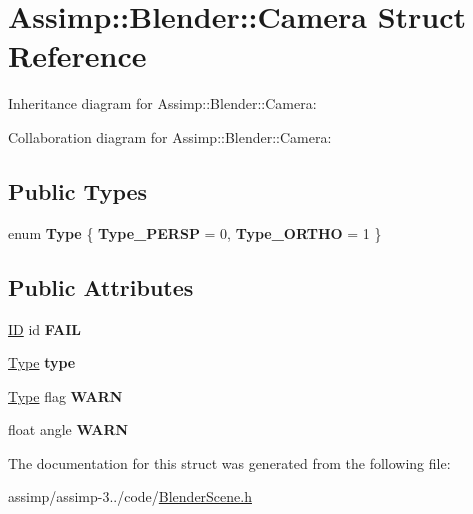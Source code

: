 \hypertarget{struct_assimp_1_1_blender_1_1_camera}{\section{Assimp\+:\+:Blender\+:\+:Camera Struct Reference}
\label{struct_assimp_1_1_blender_1_1_camera}
}


Inheritance diagram for Assimp\+:\+:Blender\+:\+:Camera\+:


Collaboration diagram for Assimp\+:\+:Blender\+:\+:Camera\+:
\subsection*{Public Types}
\begin{DoxyCompactItemize}
\item 
\hypertarget{struct_assimp_1_1_blender_1_1_camera_a99b49771ae332ffea98a1df778a6c126}{enum {\bfseries Type} \{ {\bfseries Type\+\_\+\+P\+E\+R\+S\+P} = 0, 
{\bfseries Type\+\_\+\+O\+R\+T\+H\+O} = 1
 \}}\label{struct_assimp_1_1_blender_1_1_camera_a99b49771ae332ffea98a1df778a6c126}

\end{DoxyCompactItemize}
\subsection*{Public Attributes}
\begin{DoxyCompactItemize}
\item 
\hypertarget{struct_assimp_1_1_blender_1_1_camera_a1ed22457310928334711fc521723db3c}{\hyperlink{struct_assimp_1_1_blender_1_1_i_d}{I\+D} id {\bfseries F\+A\+I\+L}}\label{struct_assimp_1_1_blender_1_1_camera_a1ed22457310928334711fc521723db3c}

\item 
\hypertarget{struct_assimp_1_1_blender_1_1_camera_aa3c785a895efc864fdb4c1a4d8a0e876}{\hyperlink{struct_type}{Type} {\bfseries type}}\label{struct_assimp_1_1_blender_1_1_camera_aa3c785a895efc864fdb4c1a4d8a0e876}

\item 
\hypertarget{struct_assimp_1_1_blender_1_1_camera_a78925f6f83d4f18b2dbfa47c76df219c}{\hyperlink{struct_type}{Type} flag {\bfseries W\+A\+R\+N}}\label{struct_assimp_1_1_blender_1_1_camera_a78925f6f83d4f18b2dbfa47c76df219c}

\item 
\hypertarget{struct_assimp_1_1_blender_1_1_camera_aff5b98c4c8e7071c8106d1aaeed7b691}{float angle {\bfseries W\+A\+R\+N}}\label{struct_assimp_1_1_blender_1_1_camera_aff5b98c4c8e7071c8106d1aaeed7b691}

\end{DoxyCompactItemize}


The documentation for this struct was generated from the following file\+:\begin{DoxyCompactItemize}
\item 
assimp/assimp-\/3../code/\hyperlink{_blender_scene_8h}{Blender\+Scene.\+h}\end{DoxyCompactItemize}
